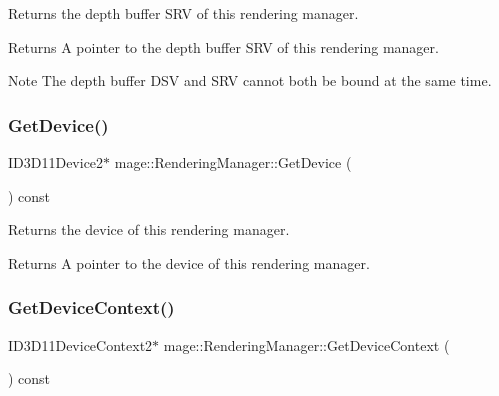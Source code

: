Returns the depth buffer S\+RV of this rendering manager.

\begin{DoxyReturn}{Returns}
A pointer to the depth buffer S\+RV of this rendering manager. 
\end{DoxyReturn}
\begin{DoxyNote}{Note}
The depth buffer D\+SV and S\+RV cannot both be bound at the same time. 
\end{DoxyNote}
\hypertarget{classmage_1_1_rendering_manager_a9881f16fe6b212d4650f65e7a273b329}{}\label{classmage_1_1_rendering_manager_a9881f16fe6b212d4650f65e7a273b329} 
\subsubsection{\texorpdfstring{Get\+Device()}{GetDevice()}}
{\footnotesize\ttfamily I\+D3\+D11\+Device2$\ast$ mage\+::\+Rendering\+Manager\+::\+Get\+Device (\begin{DoxyParamCaption}{ }\end{DoxyParamCaption}) const\hspace{0.3cm}{\ttfamily [noexcept]}}

Returns the device of this rendering manager.

\begin{DoxyReturn}{Returns}
A pointer to the device of this rendering manager. 
\end{DoxyReturn}
\hypertarget{classmage_1_1_rendering_manager_aac3ba0082e34614ce6bcef33fb89ce85}{}\label{classmage_1_1_rendering_manager_aac3ba0082e34614ce6bcef33fb89ce85} 
\subsubsection{\texorpdfstring{Get\+Device\+Context()}{GetDeviceContext()}}
{\footnotesize\ttfamily I\+D3\+D11\+Device\+Context2$\ast$ mage\+::\+Rendering\+Manager\+::\+Get\+Device\+Context (\begin{DoxyParamCaption}{ }\end{DoxyParamCaption}) const\hspace{0.3cm}{\ttfamily [noexcept]}}

